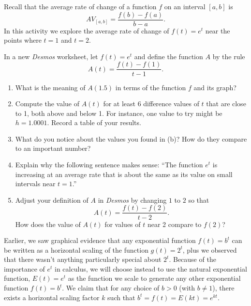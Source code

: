 \documentclass[nooutcomes]{ximera}
\begin{document}
\begin{exploration}
Recall that the average rate of change of a function $f$ on an interval $[a,b]$ is%
\begin{equation*}
AV_{[a,b]} = \frac{f(b)-f(a)}{b-a}\text{.}
\end{equation*}
In this activity we explore the average rate of change of $f(t) = e^t$ near the points where $t = 1$ and $t = 2$.%
\par
\hypertarget{p-1392}{}%
In a new \emph{Desmos} worksheet, let $f(t) = e^t$ and define the function $A$ by the rule%
\begin{equation*}
A(t) = \frac{f(t)-f(1)}{t-1}\text{.}
\end{equation*}
\begin{enumerate}[label=\alph*.]
\item What is the meaning of $A(1.5)$ in terms of the function $f$ and its graph?%
\item Compute the value of $A(t)$ for at least $6$ difference values of $t$ that are close to 1, both above and below 1.  For instance, one value to try might be $h = 1.0001$.  Record a table of your results.%
\item\hypertarget{li-634}{}\hypertarget{p-1396}{}%
What do you notice about the values you found in (b)?  How do they compare to an important number?%
\item\hypertarget{li-635}{}\hypertarget{p-1397}{}%
Explain why the following sentence makes sense: ``The function $e^t$ is increasing at an average rate that is about the same as its value on small intervals near $t = 1$.''%
\item\hypertarget{li-636}{}\hypertarget{p-1398}{}%
Adjust your definition of $A$ in \emph{Desmos} by changing $1$ to $2$ so that%
\begin{equation*}
A(t) = \frac{f(t)-f(2)}{t-2}\text{.}
\end{equation*}
How does the value of $A(t)$ for values of $t$ near 2 compare to $f(2)$?%
\end{enumerate}

\end{exploration}



Earlier, we saw graphical evidence that any exponential function $f(t) = b^t$ can be written as a horizontal scaling of the function $g(t) = 2^t$, plus we observed that there wasn't anything particularly special about $2^t$.    Because of the importance of $e^t$ in calculus, we will choose instead to use the natural exponential function, 	$E(t) = e^t$ as the function we scale to generate any other exponential function $f(t) = b^t$.  We claim that for any choice of $b \gt 0$ (with $b \ne 1$), there exists a horizontal scaling factor $k$ such that $b^t = f(t) = E(kt) = e^{kt}$.
\end{document}
